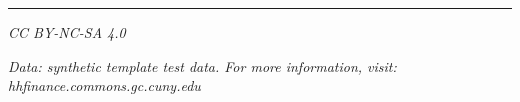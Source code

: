 \documentclass[12pt]{article}
\def\hfwgsnapshotlicense{CC BY-NC-SA 4.0}
\begin{document}
\vfill
\noindent\textcolor{hfwgrule}{\rule{\textwidth}{0.7pt}}\par
\vspace{0.15em}
\noindent
\begin{minipage}[t]{0.47\textwidth}
\scriptsize\raggedright\itshape
\hfwgsnapshotlicense
\end{minipage}\hfill
\begin{minipage}[t]{0.47\textwidth}
\scriptsize\raggedleft\itshape
Data: synthetic template test data. For more information, visit:
hhfinance.commons.gc.cuny.edu
\end{minipage}\par
\endgroup
\restoregeometry


\end{document}
